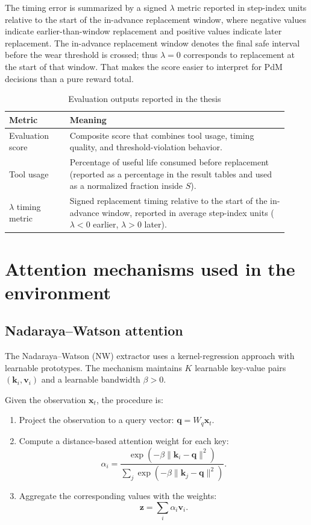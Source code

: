 \documentclass[12pt,oneside]{book}
\begin{document}
The timing error is summarized by a signed $\lambda$ metric reported in step-index units relative to the start of the in-advance replacement window, where negative values indicate earlier-than-window replacement and positive values indicate later replacement. The in-advance replacement window denotes the final safe interval before the wear threshold is crossed; thus $\lambda = 0$ corresponds to replacement at the start of that window. That makes the score easier to interpret for PdM decisions than a pure reward total.

\begin{table}[htbp]
\centering
\caption{Evaluation outputs reported in the thesis}
\label{tab:eval-metrics}
\begin{tabular}{L{0.20\linewidth} L{0.72\linewidth}}
\toprule
\textbf{Metric} & \textbf{Meaning} \\
\midrule
Evaluation score & Composite score that combines tool usage, timing quality, and threshold-violation behavior. \\
Tool usage & Percentage of useful life consumed before replacement (reported as a percentage in the result tables and used as a normalized fraction inside $S$). \\
$\lambda$ timing metric & Signed replacement timing relative to the start of the in-advance window, reported in average step-index units ($\lambda<0$ earlier, $\lambda>0$ later). \\
\bottomrule
\end{tabular}
\end{table}

\section{Attention mechanisms used in the environment}
\subsection{Nadaraya--Watson attention}
The Nadaraya--Watson (NW) extractor uses a kernel-regression approach with learnable prototypes. The mechanism maintains $K$ learnable key-value pairs $(\mathbf{k}_i, \mathbf{v}_i)$ and a learnable bandwidth $\beta > 0$.

Given the observation $\mathbf{x}_t$, the procedure is:
\begin{enumerate}
\item Project the observation to a query vector: $\mathbf{q} = W_q \mathbf{x}_t$.
\item Compute a distance-based attention weight for each key:
\begin{equation}
\alpha_i = \frac{\exp(-\beta \lVert \mathbf{k}_i - \mathbf{q} \rVert^2)}{\sum_j \exp(-\beta \lVert \mathbf{k}_j - \mathbf{q} \rVert^2)}.
\end{equation}
\item Aggregate the corresponding values with the weights:
\begin{equation}
\mathbf{z} = \sum_i \alpha_i \mathbf{v}_i.
\end{equation}
\end{enumerate}
\end{document}
